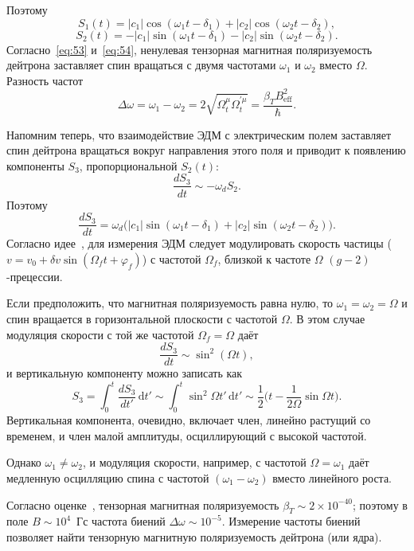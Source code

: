 \documentclass[11pt,a4paper]{article}
\begin{document}
Поэтому
\begin{equation}
S_1(t)=|c_1|\cos(\omega_1 t-\delta_1)+|c_2|\cos(\omega_2 t-\delta_2),
\label{eq:53}
\end{equation}
\begin{equation}
S_2(t)=-|c_1|\sin(\omega_1 t-\delta_1)-|c_2|\sin(\omega_2 t-\delta_2).
\label{eq:54}
\end{equation}
Согласно~\eqref{eq:53} и~\eqref{eq:54}, ненулевая тензорная магнитная
поляризуемость дейтрона заставляет спин вращаться с двумя частотами
$\omega_1$ и $\omega_2$ вместо $\Omega$. Разность частот
\[
\Delta\omega=\omega_1-\omega_2
=2\sqrt{\Omega_t^{\mu}\Omega_t^{\prime\mu}}
=\frac{\beta_T B_{\mathrm{eff}}^2}{\hbar}.
\]

Напомним теперь, что взаимодействие ЭДМ с электрическим полем заставляет
спин дейтрона вращаться вокруг направления этого поля и приводит
к появлению компоненты $S_3$, пропорциональной $S_2(t)$:
\begin{equation}
\frac{dS_3}{dt}\sim -\omega_d S_2.
\label{eq:55}
\end{equation}
Поэтому
\begin{equation}
\frac{dS_3}{dt}
=\omega_d\bigl(|c_1|\sin(\omega_1 t-\delta_1)+|c_2|\sin(\omega_2 t-\delta_2)\bigr).
\label{eq:56}
\end{equation}
Согласно идее~\cite{Orlov05}, для измерения ЭДМ следует модулировать
скорость частицы ($v=v_0+\delta v\sin(\Omega_f t+\varphi_f)$) с частотой
$\Omega_f$, близкой к частоте $\Omega$ $(g-2)$-прецессии.

Если предположить, что магнитная поляризуемость равна нулю, то
$\omega_1=\omega_2=\Omega$ и спин вращается в горизонтальной плоскости
с частотой $\Omega$. В этом случае модуляция скорости с той же частотой
$\Omega_f=\Omega$ даёт
\begin{equation}
\frac{dS_3}{dt}\sim\sin^2(\Omega t),
\label{eq:57}
\end{equation}
и вертикальную компоненту можно записать как
\[
S_3=\int_0^t\frac{dS_3}{dt'}\,\mathrm{d}t'
\sim\int_0^t\sin^2\Omega t'\,\mathrm{d}t'
\sim\frac12\Biggl(t-\frac{1}{2\Omega}\sin\Omega t\Biggr).
\]
Вертикальная компонента, очевидно, включает член, линейно растущий со временем,
и член малой амплитуды, осциллирующий с высокой частотой.

Однако $\omega_1\ne\omega_2$, и модуляция скорости, например, с частотой
$\Omega=\omega_1$ даёт медленную осцилляцию спина с частотой
$(\omega_1-\omega_2)$ вместо линейного роста.

Согласно оценке~\cite{Chen98}, тензорная магнитная поляризуемость
$\beta_T\sim 2\times 10^{-40}$; поэтому в поле $B\sim 10^{4}$~Гс частота
биений $\Delta\omega\sim 10^{-5}$. Измерение частоты биений позволяет
найти тензорную магнитную поляризуемость дейтрона (или ядра).
\end{document}
